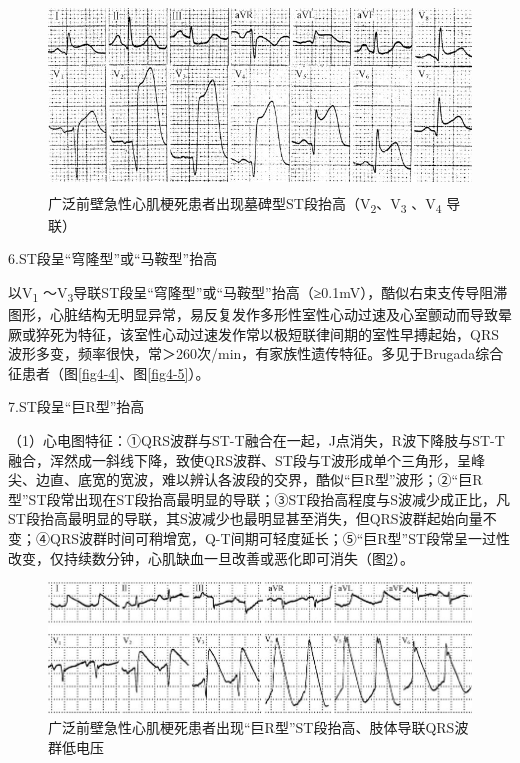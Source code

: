\begin{figure}[!htbp]
 \centering
 \includegraphics[width=4.79167in,height=1.95833in]{./images/Image00086.jpg}
 \captionsetup{justification=centering}
 \caption{广泛前壁急性心肌梗死患者出现墓碑型ST段抬高（V\textsubscript{2}、V\textsubscript{3} 、V\textsubscript{4} 导联）}
 \label{fig5-5}
  \end{figure} 


6.ST段呈“穹隆型”或“马鞍型”抬高

以V\textsubscript{1} ～V\textsubscript{3}导联ST段呈“穹隆型”或“马鞍型”抬高（≥0.1mV），酷似右束支传导阻滞图形，心脏结构无明显异常，易反复发作多形性室性心动过速及心室颤动而导致晕厥或猝死为特征，该室性心动过速发作常以极短联律间期的室性早搏起始，QRS波形多变，频率很快，常＞260次/min，有家族性遗传特征。多见于Brugada综合征患者（图\ref{fig4-4}、图\ref{fig4-5}）。

7.ST段呈“巨R型”抬高

（1）心电图特征：①QRS波群与ST-T融合在一起，J点消失，R波下降肢与ST-T融合，浑然成一斜线下降，致使QRS波群、ST段与T波形成单个三角形，呈峰尖、边直、底宽的宽波，难以辨认各波段的交界，酷似“巨R型”波形；②“巨R型”ST段常出现在ST段抬高最明显的导联；③ST段抬高程度与S波减少成正比，凡ST段抬高最明显的导联，其S波减少也最明显甚至消失，但QRS波群起始向量不变；④QRS波群时间可稍增宽，Q-T间期可轻度延长；⑤“巨R型”ST段常呈一过性改变，仅持续数分钟，心肌缺血一旦改善或恶化即可消失（图\ref{fig5-6}）。

\begin{figure}[!htbp]
 \centering
 \includegraphics{./images/Image00087.jpg}
 \captionsetup{justification=centering}
 \caption{广泛前壁急性心肌梗死患者出现“巨R型”ST段抬高、肢体导联QRS波群低电压}
 \label{fig5-6}
  \end{figure} 

